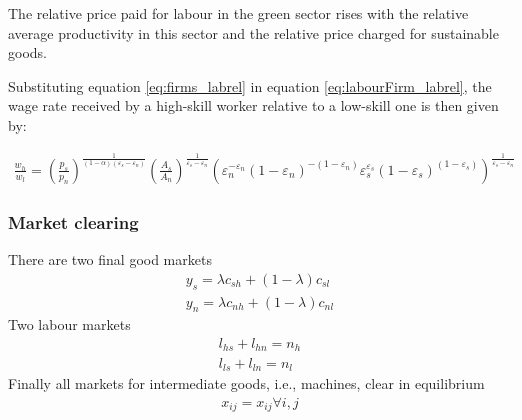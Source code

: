 The relative price paid for labour in the green sector rises with the relative average productivity in this sector and the relative price charged for sustainable goods. 

Substituting equation  \ref{eq:firms_labrel}  in equation \ref{eq:labourFirm_labrel},
the wage rate received by a high-skill worker relative to a low-skill one is then given by:

\begin{align}
\frac{w_h}{w_l}=\left(\frac{p_s}{p_n}\right)^\frac{1}{(1-\alpha)(\varepsilon_s-\varepsilon_n)} \left(\frac{A_s}{A_n}\right)^\frac{1}{\varepsilon_s-\varepsilon_n}\left(\varepsilon_n^{-\varepsilon_n} (1-\varepsilon_n)^{-(1-\varepsilon_n)}\varepsilon_s^{\varepsilon_s} (1-\varepsilon_s)^{(1-\varepsilon_s)} \right)^\frac{1}{\varepsilon_s-\varepsilon_n}
\end{align}


\subsubsection{Market clearing}
There are two final good markets
\begin{align*}
y_s=\lambda c_{sh}+(1-\lambda) c_{sl}\\
y_n=\lambda c_{nh}+(1-\lambda) c_{nl}
\end{align*}
Two labour markets
\begin{align*}
l_{hs}+l_{hn}=n_h\\
l_{ls}+l_{ln}=n_l
\end{align*}
Finally all markets for intermediate goods, i.e., machines, clear in equilibrium
\begin{align*}
x_{ij}=x_{ij} \forall i,j
\end{align*}

